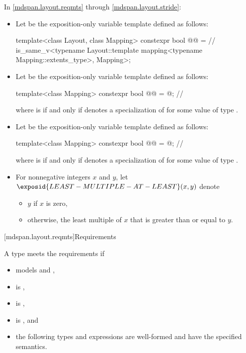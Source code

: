 \pnum
In \ref{mdspan.layout.reqmts} through \ref{mdspan.layout.stride}:
\begin{itemize}
\item
Let  be the exposition-only variable template defined as follows:
\begin{codeblock}
template<class Layout, class Mapping>
constexpr bool @@ =  // \expos
  is_same_v<typename Layout::template mapping<typename Mapping::extents_type>, Mapping>;
\end{codeblock}
\item
Let  be
the exposition-only variable template defined as follows:
\begin{codeblock}
template<class Mapping>
constexpr bool @@ = @\seebelow@;   // \expos
\end{codeblock}
where  is 
if and only if  denotes
a specialization of 
for some value  of type .
\item
Let  be
the exposition-only variable template defined as follows:
\begin{codeblock}
template<class Mapping>
constexpr bool @@ = @\seebelow@;   // \expos
\end{codeblock}
where  is 
if and only if  denotes
a specialization of 
for some value  of type .
\item
For nonnegative integers $x$ and $y$,
let $\exposid{LEAST-MULTIPLE-AT-LEAST}(x, y)$ denote
\begin{itemize}
\item
$y$ if $x$ is zero,
\item
otherwise, the least multiple of $x$ that is greater than or equal to $y$.
\end{itemize}
\end{itemize}

[mdspan.layout.reqmts]{Requirements}

\pnum
A type  meets the  requirements if

\begin{itemize}
\item
{} models  and ,
\item
{} is ,
\item
{} is ,
\item
{} is , and
\item
the following types and expressions are well-formed and
have the specified semantics.
\end{itemize}

